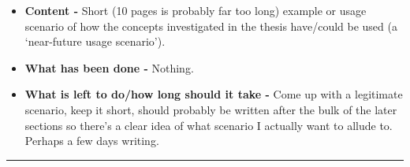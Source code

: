 \begin{itemize}
	\item \textbf{Content -} Short (10 pages is probably far too long) example or usage scenario of how the concepts investigated in the thesis have/could be used (a `near-future usage scenario').
	\item \textbf{What has been done -} Nothing.
	\item \textbf{What is left to do/how long should it take -} Come up with a legitimate scenario, keep it short, should probably be written after the bulk of the later sections so there's a clear idea of what scenario I actually want to allude to. Perhaps a few days writing.
\end{itemize}

\hrule

\vspace{10mm}

